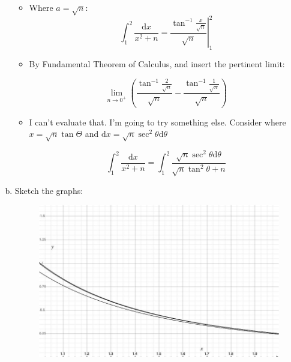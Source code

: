 \documentclass[11pt]{article}
\begin{document}
\begin{enumerate}[a)]
\begin{itemize}
	\item Where $a = \sqrt{n}$:
	\begin{equation*}
	\int_1^2 \! \frac{\mathrm{d}x}{x^2 + n} = \left.\frac{\tan^{-1}\frac{x}{\sqrt{n}}}{\sqrt{n}}\right|_1^2
	\end{equation*}
	
	\item By Fundamental Theorem of Calculus, and insert the pertinent limit:
	
	\begin{equation*}
	\lim_{n \to 0^+}\left(\frac{\tan^{-1}\frac{2}{\sqrt{n}}}{\sqrt{n}} - \frac{\tan^{-1}\frac{1}{\sqrt{n}}}{\sqrt{n}}\right)
	\end{equation*}
	
	\item I can't evaluate that. I'm going to try something else. Consider where $x = \sqrt n \tan\Theta$ and $\mathrm{d}x = \sqrt n \sec^2\theta\mathrm{d}\theta$
	
	\begin{equation*}
	\int_1^2 \! \frac{\mathrm{d}x}{x^2 + n} = \int_1^2 \! \frac{\sqrt n\sec^2\theta\mathrm{d}\theta}{\sqrt n \tan^2\theta + n}
	\end{equation*}
	
	\end{itemize}

\item Sketch the graphs:

\begin{figure}[h]
     \centering
          \label{graph.jpg}
          \includegraphics*[height=.65\linewidth]{graph.jpg}
\end{figure}

\end{enumerate}
\end{document}
